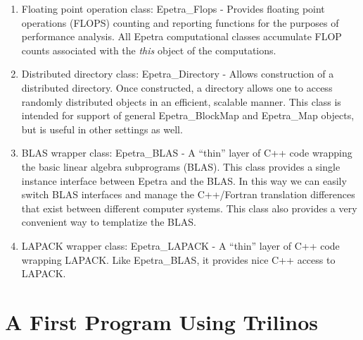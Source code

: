\begin{itemize}
\begin{enumerate}
\item Floating point operation class: Epetra\_Flops - Provides floating
  point operations (FLOPS) counting and reporting functions for the
  purposes of performance analysis.  All Epetra computational classes
  accumulate FLOP counts associated with the {\sl this} object of the
  computations.
\item Distributed directory class: Epetra\_Directory - Allows
  construction of a distributed directory.  Once constructed, a
  directory allows one to access randomly distributed objects in an
  efficient, scalable manner.  This class is intended for support of
  general Epetra\_BlockMap and Epetra\_Map objects, but is useful in other
  settings as well.
\item BLAS wrapper class: Epetra\_BLAS - A ``thin'' layer of C++ code
  wrapping the basic linear algebra subprograms (BLAS).  This class
  provides a single instance interface between Epetra and the BLAS.  In
  this way we can easily switch BLAS interfaces and manage the
  C++/Fortran translation differences that exist between different
  computer systems.  This class also provides a very convenient way to
  templatize the BLAS.
\item LAPACK wrapper class: Epetra\_LAPACK - A ``thin'' layer of C++ code
  wrapping LAPACK.  Like Epetra\_BLAS, it provides nice C++ access to
  LAPACK.
\end{enumerate}

\end{itemize}



























\section{A First Program Using Trilinos}

